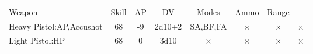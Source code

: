 \documentclass{article}
\newenvironment{Weapons}{\begin{tabular}{lccccccc}Weapon & Skill & AP & DV & Modes & Ammo & Range\\}{\end{tabular}}
\newcommand{\ranged}[8]{#1 & #2 & #3 & #4 & #5 & #6 & #7 & #8\\}
\begin{document}
\begin{Weapons}
 \ranged{Heavy Pistol:AP,Accushot}{68}{-9}{2d10+2}{SA,BF,FA}{×}{×}{×}
 \ranged{Light Pistol:HP}{68}{0}{3d10}{×}{×}{×}{×}
\end{Weapons}

% 

\end{document}
